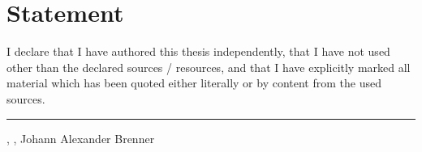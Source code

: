 {}
\thispagestyle{empty}
\chapter*{Statement}
I declare that I have authored this thesis independently, that I have not used other than the declared
sources / resources, and that I have explicitly marked all material which has been quoted either
literally or by content from the used sources. 

\vspace{18.1mm}
\rule[-3.7mm]{\linewidth}{0.5pt}
\Ort{}, \Datum{}, Johann Alexander Brenner